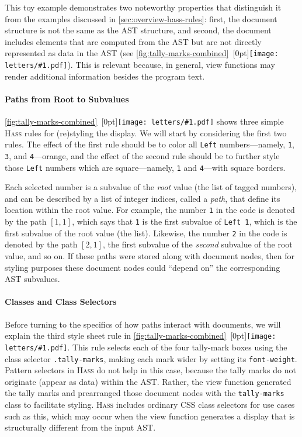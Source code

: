 \documentclass[acmsmall, screen]{acmart}
\newcommand{\parahead}[1]
  {\paragraph{\textbf{#1}}}
\newcommand{\hass}
{\textsc{Hass}}
\newcommand{\cssAttr}[1]
{\texttt{#1}}
\newcommand{\cssClass}[1]
  {\texttt{#1}}
\newcommand{\figBubble}[1]{\raisebox{-0.03in}[0pt]{\texttt{[image: letters/\#1.pdf]}}}
\newcommand{\refBubble}[1]
  {~\figBubble{#1}}
\begin{document}
This toy example demonstrates two noteworthy properties that distinguish it from the examples discussed in \autoref{sec:overview-hass-rules}:
first, the document structure is not the same as the AST structure, and
second, the document includes elements that are computed from the AST but are not directly represented as data in the AST (see \autoref{fig:tally-marks-combined}\refBubble{f}).
This is relevant because, in general, view functions may render additional information besides the program text.




\parahead{Paths from Root to Subvalues}

\autoref{fig:tally-marks-combined}\refBubble{d} shows three simple \hass{} rules for (re)styling the display.
We will start by considering the first two rules.
The effect of the first rule should be to color all \texttt{Left} numbers---namely, \texttt{1}, \texttt{3}, and \texttt{4}---orange, and the effect of the second rule should be to further style those \texttt{Left} numbers which are square---namely, \texttt{1} and \texttt{4}---with square borders.

Each selected number is a subvalue of the \emph{root} value (the list of tagged numbers), and can be described by a list of integer indices, called a \emph{path}, that define its location within the root value.
For example, the number \texttt{1} in the code is denoted by the path $[1,1]$, which says that \texttt{1} is the first subvalue of \texttt{Left 1}, which is the first subvalue of the root value (the list).
Likewise, the number \texttt{2} in the code is denoted by the path $[2, 1]$, the first subvalue of the \emph{second} subvalue of the root value, and so on.
If these paths were stored along with document nodes, then for styling purposes these document nodes could ``depend on'' the corresponding AST subvalues.

\parahead{Classes and Class Selectors}

Before turning to the specifics of how paths interact with documents, we will explain the third style sheet rule in \autoref{fig:tally-marks-combined}\refBubble{d}.
This rule selects each of the four tally-mark boxes using the class selector \cssClass{.tally-marks}, making each mark wider by setting its \cssAttr{font-weight}.
Pattern selectors in \hass{} do not help in this case, because the tally marks do not originate (appear as data) within the AST.
Rather, the view function generated the tally marks and prearranged those document nodes with the \cssClass{tally-marks} class to facilitate styling.
\hass{} includes ordinary CSS class selectors for use cases such as this, which may occur when the view function generates a display that is structurally different from the input AST.
\end{document}
